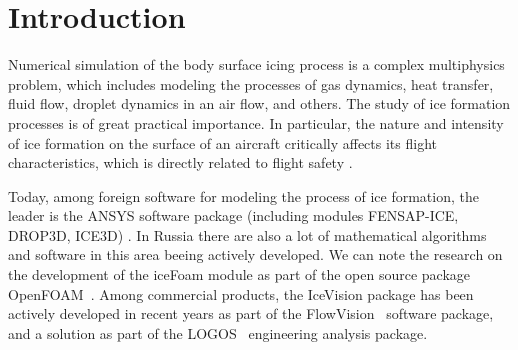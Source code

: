 \documentclass[
11pt,%
tightenlines,%
twoside,%
onecolumn,%
nofloats,%
nobibnotes,%
nofootinbib,%
superscriptaddress,%
noshowpacs,%
centertags]%
{revtex4-2}
\begin{document}


\maketitle


\section{Introduction}

Numerical simulation of the body surface icing process is a complex multiphysics problem, which includes modeling the processes of gas dynamics, heat transfer, fluid flow, droplet dynamics in an air flow, and others.
The study of ice formation processes is of great practical importance.
In particular, the nature and intensity of ice formation on the surface of an aircraft critically affects its flight characteristics, which is directly related to flight safety \cite{Raj}.

Today, among foreign software for modeling the process of ice formation, the leader is the ANSYS software package (including modules FENSAP-ICE, DROP3D, ICE3D) \cite{Martini}.
In Russia there are also a lot of mathematical algorithms and software in this area beeing actively developed.
We can note the research on the development of the iceFoam module as part of the open source package OpenFOAM~\cite{Strijhak}.
Among commercial products, the IceVision package has been actively developed in recent years as part of the FlowVision~\cite{Sorokin} software package, and a solution as part of the LOGOS~\cite{Galanov} engineering analysis package.
\end{document}
